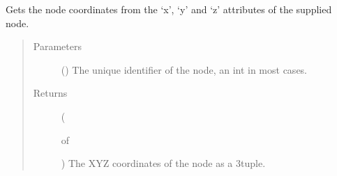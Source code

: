 \documentclass[letterpaper,10pt,english]{sphinxmanual}
\begin{document}
\begin{fulllineitems}
\begin{fulllineitems}
\label{\detokenize{cockatoo:cockatoo.KnitNetworkBase.node_coordinates}}
Gets the node coordinates from the ‘x’, ‘y’ and ‘z’ attributes of the
supplied node.
\begin{quote}\begin{description}
\item[{Parameters}] \leavevmode
{} () \textendash{} The unique identifier of the node, an int in most cases.

\item[{Returns}] \leavevmode
{} (%
\begin{footnote}[91]\sphinxAtStartFootnote
{}
%
\end{footnote} of %
\begin{footnote}[92]\sphinxAtStartFootnote
{}
%
\end{footnote}) \textendash{} The XYZ coordinates of the node as a 3\sphinxhyphen{}tuple.

\end{description}\end{quote}

\end{fulllineitems}



\end{fulllineitems}
\end{document}
